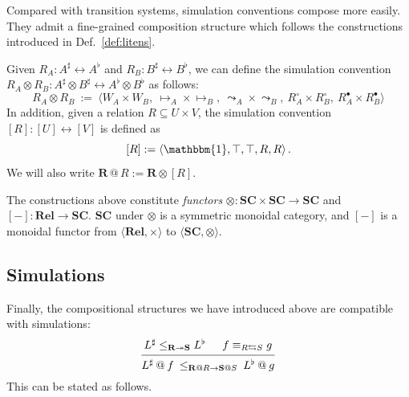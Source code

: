 \documentclass[acmsmall,screen,review,anonymous]{acmart}
\newcommand{\que}{\circ}
\newcommand{\ans}{\bullet}
\newcommand{\lensarrow}{\leftrightarrows}
\newcommand{\lensle}{\equiv}
\begin{document}
Compared with transition systems,
simulation conventions compose more easily.
They admit a fine-grained
composition structure
which follows the constructions introduced in Def.~\ref{def:litens}.

\begin{definition} \label{def:sctens}
Given $R_A : A^\sharp \leftrightarrow A^\flat$
and $R_B : B^\sharp \leftrightarrow B^\flat$,
we can define the simulation convention
$R_A \otimes R_B : A^\sharp \otimes B^\sharp
  \leftrightarrow
  A^\flat \otimes B^\flat$
as follows:
\[
  R_A \otimes R_B \: := \:
    \big\langle
      W_A \times W_B, \:
      {\mapsto_A} \times {\mapsto_B}, \:
      {\leadsto_A} \times {\leadsto_B}, \:
      R_A^\que \times R_B^\que, \:
      R_A^\ans \times R_B^\ans
    \big\rangle
\]
In addition,
given a relation $R \subseteq U \times V$,
the simulation convention $[R] : [U] \leftrightarrow [V]$
is defined as
\[
  [R] := \langle \mathbbm{1}, \top, \top, R, R \rangle
  \,.
\]
We will also write $\mathbf{R} \mathbin@ R := \mathbf{R} \otimes [R]$.
\end{definition}


\begin{theorem}
The constructions above constitute \emph{functors}
${\otimes} : \mathbf{SC} \times \mathbf{SC} \rightarrow \mathbf{SC}$
and
$[-] : \mathbf{Rel} \rightarrow \mathbf{SC}$.
$\mathbf{SC}$ under $\otimes$ is a symmetric monoidal category,
and $[-]$ is a monoidal functor
from $\langle \mathbf{Rel}, {\times} \rangle$ to
$\langle \mathbf{SC}, {\otimes} \rangle$.
\end{theorem}


\subsection{Simulations} \label{sec:scomp:sim} %

Finally,
the compositional structures we have introduced above
are compatible with simulations:
\[
  \begin{prooftree}
    \hypo{L^\sharp \le_{\mathbf{R} \twoheadrightarrow \mathbf{S}} L^\flat}
    \hypo{f \lensle_{R \lensarrow S} g}
    \infer2{
      L^\sharp \mathbin@ f
      \:\le_{\mathbf{R}\mathbin@R \rightarrow \mathbf{S}\mathbin@S}\:
      L^\flat \mathbin@ g
    }
  \end{prooftree}
\]
This can be stated as follows.
\end{document}
